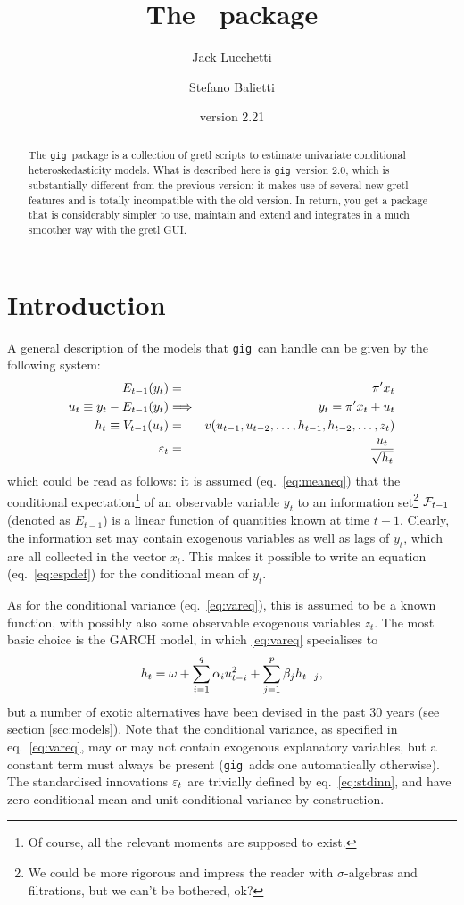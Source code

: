 \documentclass[a4paper,11pt]{article}
\title{The \gig\ package}
\author{Jack Lucchetti \and Stefano Balietti}
\date{version 2.21}
\newcommand{\app}[1]{\textsf{#1}}
\newcounter{script}[section]
\newcommand{\stdu}{\ensuremath \varepsilon}
\newcommand{\uhat}{\ensuremath u}
\newcommand{\InfSet}[1]{\ensuremath \mathcal{F}_{#1}}
\newcommand{\gig}{\texttt{gig}}
\begin{document}
\maketitle

\begin{abstract}
The \gig\ package is a collection of \app{gretl} scripts to estimate
univariate conditional heteroskedasticity models. What is described
here is \gig\ version 2.0, which is substantially different from the
previous version: it makes use of several new \app{gretl} features and
is totally incompatible with the old version. In return, you get a
package that is considerably simpler to use, maintain and extend and
integrates in a much smoother way with the \app{gretl} GUI.
\end{abstract}

\tableofcontents

\section{Introduction}

A general description of the models that \gig\ can handle can be given
by the following system:
\begin{eqnarray}
  \label{eq:meaneq}
  E_{t-1}(y_t) & = & \pi'x_t \\
  \label{eq:espdef}
  \uhat_{t} \equiv y_t - E_{t-1}(y_t) & \Longrightarrow &
  y_t = \pi'x_t + \uhat_{t} \\
  \label{eq:vareq}
  h_t \equiv V_{t-1}(\uhat_{t}) & = & 
  v(\uhat_{t-1}, \uhat_{t-2}, \ldots, 
  h_{t-1}, h_{t-2}, \ldots, z_t) \\
  \label{eq:stdinn}
  \stdu_t & = & \frac{\uhat_{t}}{\sqrt{h_t}}
\end{eqnarray}
which could be read as follows: it is assumed (eq.~\ref{eq:meaneq})
that the conditional expectation\footnote{Of course, all the relevant
  moments are supposed to exist.} of an observable variable $y_t$ to an
information set\footnote{We could be more rigorous and impress the
  reader with $\sigma$-algebras and filtrations, but we can't be
  bothered, ok?}  $\InfSet{t-1}$ (denoted as $E_{t-1}$) is a linear
function of quantities known at time $t-1$. Clearly, the information
set may contain exogenous variables as well as lags of $y_t$, which
are all collected in the vector $x_t$. This makes it possible to write
an equation (eq.~\ref{eq:espdef}) for the conditional mean of $y_t$.

As for the conditional variance (eq.~\ref{eq:vareq}), this is assumed
to be a known function, with possibly also some observable exogenous
variables $z_t$. The most basic choice is the GARCH model, in which
\eqref{eq:vareq} specialises to
\[
  h_t = \omega +  \sum_{i=1}^q \alpha_i \uhat_{t-i}^2 + 
  \sum_{j=1}^p\beta_j h_{t-j} ,
\]
but a number of exotic alternatives have been devised in the past 30
years (see section \ref{sec:models}). Note that the conditional
variance, as specified in eq.~\eqref{eq:vareq}, may or may not contain
exogenous explanatory variables, but a constant term must always be
present (\gig\ adds one automatically otherwise). The
standardised innovations $\stdu_t$ are trivially defined by
eq.~\eqref{eq:stdinn}, and have zero conditional mean and unit
conditional variance by construction.
\end{document}
